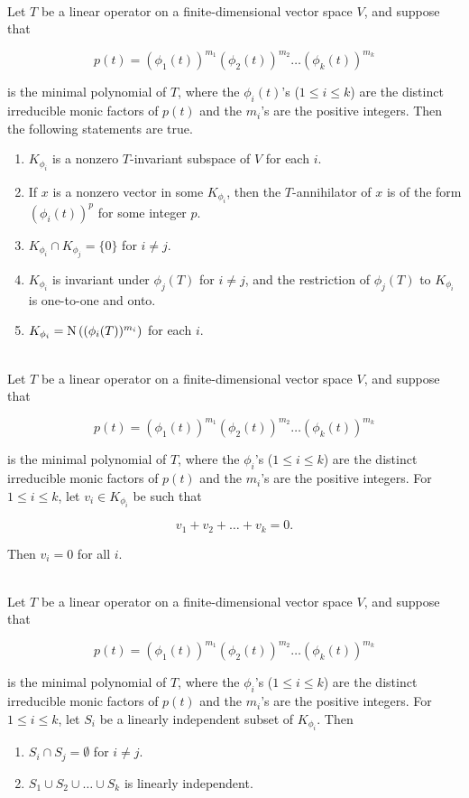 \begin{theorem}
	\hfill\\
	Let $T$ be a linear operator on a finite-dimensional vector space $V$, and suppose that

	\[p(t) = (\phi_1(t))^{m_1} (\phi_2(t))^{m_2} \dots (\phi_k(t))^{m_k}\]

	is the minimal polynomial of $T$, where the $\phi_i(t)$'s ($1 \leq i \leq k$) are the distinct irreducible monic factors of $p(t)$ and the $m_i$'s are the positive integers. Then the following statements are true.

	\begin{enumerate}
		\item $K_{\phi_i}$ is a nonzero $T$-invariant subspace of $V$ for each $i$.
		\item If $x$ is a nonzero vector in some $K_{\phi_i}$, then the $T$-annihilator of $x$ is of the form $(\phi_i(t))^p$ for some integer $p$.
		\item $K_{\phi_i} \cap K_{\phi_j} = \{0\}$ for $i \neq j$.
		\item $K_{\phi_i}$ is invariant under $\phi_j(T)$ for $i \neq j$, and the restriction of $\phi_j(T)$ to $K_{\phi_i}$ is one-to-one and onto.
		\item $K_{\phi_i} = \text{N}\left((\phi_i(T))^{m_i}\right)$ for each $i$.
	\end{enumerate}
\end{theorem}

\begin{lemma}
	\hfill\\
	Let $T$ be a linear operator on a finite-dimensional vector space $V$, and suppose that

	\[p(t) = (\phi_1(t))^{m_1} (\phi_2(t))^{m_2} \dots (\phi_k(t))^{m_k}\]

	is the minimal polynomial of $T$, where the $\phi_i$'s ($1 \leq i \leq k$) are the distinct irreducible monic factors of $p(t)$ and the $m_i$'s are the positive integers. For $1 \leq i \leq k$, let $v_i \in K_{\phi_i}$ be such that

	\[v_1 + v_2 + \dots + v_k = 0.\]

	Then $v_i = 0$ for all $i$.
\end{lemma}

\begin{theorem}
	\hfill\\
	Let $T$ be a linear operator on a finite-dimensional vector space $V$, and suppose that

	\[p(t) = (\phi_1(t))^{m_1} (\phi_2(t))^{m_2} \dots (\phi_k(t))^{m_k}\]

	is the minimal polynomial of $T$, where the $\phi_i$'s ($1 \leq i \leq k$) are the distinct irreducible monic factors of $p(t)$ and the $m_i$'s are the positive integers. For $1 \leq i \leq k$, let $S_i$ be a linearly independent subset of $K_{\phi_i}$. Then

	\begin{enumerate}
		\item $S_i \cap S_j = \emptyset$ for $i \neq j$.
		\item $S_1 \cup S_2 \cup \dots \cup S_k$ is linearly independent.
	\end{enumerate}
\end{theorem}

